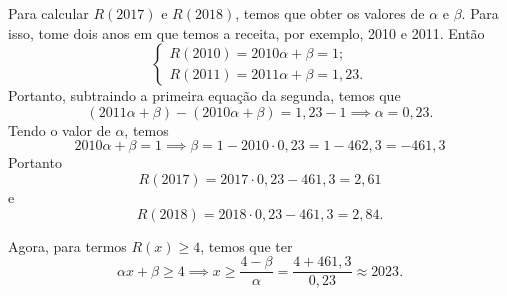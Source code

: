 Para calcular $R(2017)$ e $R(2018)$, temos que obter os valores de $\alpha$ e $\beta$.
Para isso, tome dois anos em que temos a receita, por exemplo, 2010 e 2011.
Então
\[
	\left\{
		\begin{array}{l}
			R(2010)=2010\alpha+\beta=1;\\
			R(2011)=2011\alpha+\beta=1,23.
		\end{array}
	\right.
\]
Portanto, subtraindo a primeira equação da segunda, temos que
\[
	(2011\alpha+\beta)-(2010\alpha+\beta)=1,23-1
	\implies \alpha=0,23.
\]
Tendo o valor de $\alpha$, temos
\[
	2010\alpha+\beta=1\implies \beta=1-2010\cdot0,23=1-462,3=-461,3
\]
Portanto
\[
	R(2017)=2017\cdot0,23-461,3=2,61
\]
e
\[
	R(2018)=2018\cdot0,23-461,3=2,84.
\]

Agora, para termos $R(x)\geq 4$, temos que ter
\[
	\alpha x+\beta\geq 4\implies x\geq \frac{4-\beta}{\alpha}=\frac{4+461,3}{0,23}
	\approx 2023.
\]
